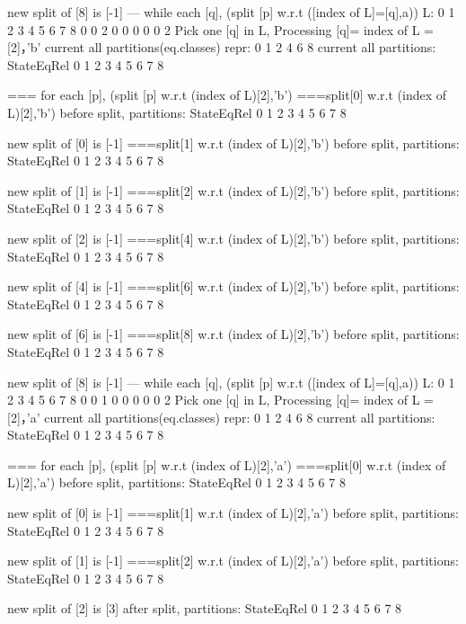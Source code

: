 new split of [8] is [-1]
--- while each [q], (split [p] w.r.t ([index of L]=[q],a))
L:
0 1 2 3 4 5 6 7 8
0 0 2 0 0 0 0 0 2
Pick one [q] in L, Processing [q]= index of L = [2]，'b'
current all partitions(eq.classes) repr:
{ 0  1  2  4  6  8 }
current all partitions:
StateEqRel
{ 0 }
{ 1 }
{ 2  3 }
{ 4  5 }
{ 6  7 }
{ 8 }

=== for each [p], (split [p] w.r.t (index of L)[2],'b')
===split[0] w.r.t (index of L)[2],'b')
before split, partitions:
StateEqRel
{ 0 }
{ 1 }
{ 2  3 }
{ 4  5 }
{ 6  7 }
{ 8 }

new split of [0] is [-1]
===split[1] w.r.t (index of L)[2],'b')
before split, partitions:
StateEqRel
{ 0 }
{ 1 }
{ 2  3 }
{ 4  5 }
{ 6  7 }
{ 8 }

new split of [1] is [-1]
===split[2] w.r.t (index of L)[2],'b')
before split, partitions:
StateEqRel
{ 0 }
{ 1 }
{ 2  3 }
{ 4  5 }
{ 6  7 }
{ 8 }

new split of [2] is [-1]
===split[4] w.r.t (index of L)[2],'b')
before split, partitions:
StateEqRel
{ 0 }
{ 1 }
{ 2  3 }
{ 4  5 }
{ 6  7 }
{ 8 }

new split of [4] is [-1]
===split[6] w.r.t (index of L)[2],'b')
before split, partitions:
StateEqRel
{ 0 }
{ 1 }
{ 2  3 }
{ 4  5 }
{ 6  7 }
{ 8 }

new split of [6] is [-1]
===split[8] w.r.t (index of L)[2],'b')
before split, partitions:
StateEqRel
{ 0 }
{ 1 }
{ 2  3 }
{ 4  5 }
{ 6  7 }
{ 8 }

new split of [8] is [-1]
--- while each [q], (split [p] w.r.t ([index of L]=[q],a))
L:
0 1 2 3 4 5 6 7 8
0 0 1 0 0 0 0 0 2
Pick one [q] in L, Processing [q]= index of L = [2]，'a'
current all partitions(eq.classes) repr:
{ 0  1  2  4  6  8 }
current all partitions:
StateEqRel
{ 0 }
{ 1 }
{ 2  3 }
{ 4  5 }
{ 6  7 }
{ 8 }

=== for each [p], (split [p] w.r.t (index of L)[2],'a')
===split[0] w.r.t (index of L)[2],'a')
before split, partitions:
StateEqRel
{ 0 }
{ 1 }
{ 2  3 }
{ 4  5 }
{ 6  7 }
{ 8 }

new split of [0] is [-1]
===split[1] w.r.t (index of L)[2],'a')
before split, partitions:
StateEqRel
{ 0 }
{ 1 }
{ 2  3 }
{ 4  5 }
{ 6  7 }
{ 8 }

new split of [1] is [-1]
===split[2] w.r.t (index of L)[2],'a')
before split, partitions:
StateEqRel
{ 0 }
{ 1 }
{ 2  3 }
{ 4  5 }
{ 6  7 }
{ 8 }

new split of [2] is [3]
after split, partitions:
StateEqRel
{ 0 }
{ 1 }
{ 2 }
{ 3 }
{ 4  5 }
{ 6  7 }
{ 8 }

